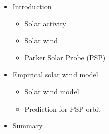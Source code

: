 {
\begin{frame}[c]{}{}
	\begin{columns}[c]

		
		\Large
		\begin{itemize}
			\item \color{gray} Introduction
			\begin{itemize} \color{gray}
				\item \large Solar activity
				\item Solar wind
				\item Parker Solar Probe (PSP)
			\end{itemize} \color{black}
			\item Empirical solar wind model
			\begin{itemize}
				\item \large Solar wind model
				\item Prediction for PSP orbit
			\end{itemize}
			\item Summary
		\end{itemize}
	\end{columns}
\end{frame}
}

